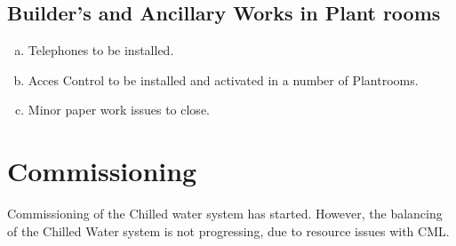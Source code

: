 \subsection{Builder's and Ancillary Works in Plant rooms}
\begin{enumerate}[a)]
\item Telephones to be installed.
\item Acces Control to be installed and activated in a number of Plantrooms.
\item Minor paper work issues to close.
\end{enumerate}


\section{Commissioning}

Commissioning of the Chilled water system has started. However, the balancing of the Chilled Water system is not progressing, due to resource issues with CML.



















